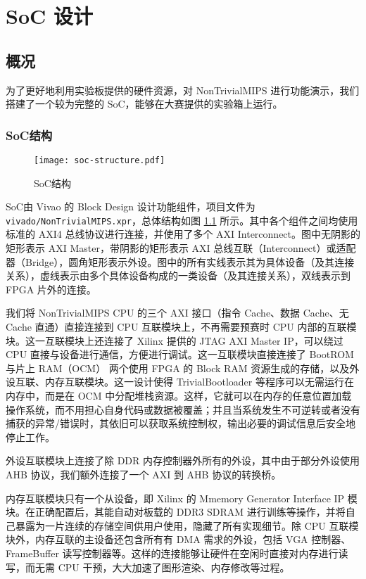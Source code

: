 \chapter{SoC 设计}

\section{概况}

为了更好地利用实验板提供的硬件资源，对 NonTrivialMIPS 进行功能演示，我们搭建了一个较为完整的 SoC，能够在大赛提供的实验箱上运行。

\subsection{SoC结构}

\begin{figure}[htbp]
    \centering
    \texttt{[image: soc-structure.pdf]}
    \caption{SoC结构}
    \label{fig:soc-structure}
\end{figure}

SoC由 Vivao 的 Block Design 设计功能组件，项目文件为 \texttt{vivado/NonTrivialMIPS.xpr}，总体结构如图 \ref{fig:soc-structure} 所示。其中各个组件之间均使用标准的 AXI4 总线协议进行连接，并使用了多个 AXI Interconnect。图中无阴影的矩形表示 AXI Master，带阴影的矩形表示 AXI 总线互联（Interconnect）或适配器（Bridge），圆角矩形表示外设。图中的所有实线表示其为具体设备（及其连接关系），虚线表示由多个具体设备构成的一类设备（及其连接关系），双线表示到 FPGA 片外的连接。

我们将 NonTrivialMIPS CPU 的三个 AXI 接口（指令 Cache、数据 Cache、无 Cache 直通）直接连接到 CPU 互联模块上，不再需要预赛时 CPU 内部的互联模块。这一互联模块上还连接了 Xilinx 提供的 JTAG AXI Master IP，可以绕过 CPU 直接与设备进行通信，方便进行调试。这一互联模块直接连接了 BootROM 与片上 RAM（OCM） 两个使用 FPGA 的 Block RAM 资源生成的存储，以及外设互联、内存互联模块。这一设计使得 TrivialBootloader 等程序可以无需运行在内存中，而是在 OCM 中分配堆栈资源。这样，它就可以在内存的任意位置加载操作系统，而不用担心自身代码或数据被覆盖；并且当系统发生不可逆转或者没有捕获的异常/错误时，其依旧可以获取系统控制权，输出必要的调试信息后安全地停止工作。

外设互联模块上连接了除 DDR 内存控制器外所有的外设，其中由于部分外设使用 AHB 协议，我们额外连接了一个 AXI 到 AHB 协议的转换桥。

内存互联模块只有一个从设备，即 Xilinx 的 Mmemory Generator Interface IP 模块。在正确配置后，其能自动对板载的 DDR3 SDRAM 进行训练等操作，并将自己暴露为一片连续的存储空间供用户使用，隐藏了所有实现细节。除 CPU 互联模块外，内存互联的主设备还包含所有有 DMA 需求的外设，包括 VGA 控制器、FrameBuffer 读写控制器等。这样的连接能够让硬件在空闲时直接对内存进行读写，而无需 CPU 干预，大大加速了图形渲染、内存修改等过程。

